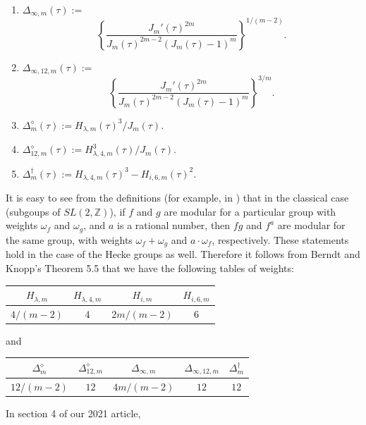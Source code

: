 \documentclass{article}
\begin{document}
 \begin{definition}
 \begin{enumerate}
 \item
$\Delta_{\infty,m}(\tau):=$
 $$
 \left \{ \frac{J_m'(\tau)^{2m}}
 {J_m(\tau)^{2m-2}(J_m(\tau)-1)^m}
\right \}^{1/(m-2)}.
 $$
 \item $\Delta_{\infty,12,m}(\tau):=$
 $$
 \left \{ \frac{J_m'(\tau)^{2m}}
 {J_m(\tau)^{2m-2}(J_m(\tau)-1)^m}
\right \}^{3/m}.
 $$
\item $\Delta^{\diamond}_m(\tau):=
H_{\lambda,m}(\tau)^3/J_m(\tau)$.
\item 
$\Delta^{\diamond}_{12,m}(\tau):= 
H_{\lambda,4,m}^3(\tau)/J_m(\tau)$.
\item $\Delta^{\dagger}_m(\tau):=
H_{\lambda,4,m}(\tau)^3-H_{i,6,m}(\tau)^2$.
 \end{enumerate}
 \end{definition} 
 \begin{remark}
 It is
 easy to see from the definitions
 (for example, in \cite{serre1970course}) that 
 in the classical case (subgoups of 
 $SL(2,\mathbb{Z})$), if
 $f$ and $g$ are modular for a particular group
 with weights $\omega_f$ and $\omega_g$,
 and $a$  is a rational number,
 then $fg$ and  $f^a$ are modular for the same group,
 with weights $\omega_f + \omega_g$ 
 and $a \cdot \omega_f$, respectively.
 These statements hold in the case of the Hecke groups
 as well.
 Therefore it follows from Berndt and Knopp's 
 Theorem 5.5 that 
  we have the following tables of weights:
 \begin{center}
\begin{tabular}{|c|c|c|c|} \hline
$H_{\lambda,m}$& $H_{\lambda,4,m}$ &$H_{i,m}$
& $H_{i,6,m}$  \\ \hline
 $4/(m-2)$&  $4$  & $2m/(m-2)$ & $6$ \\ \hline
\end{tabular} 
\end{center}
and
\begin{center}
\begin{tabular}{|c|c|c|c|c|} \hline
 $\Delta^{\diamond}_m$ 
&  $\Delta^{\diamond}_{12,m}$ & $\Delta_{\infty,m}$ 
& $\Delta_{\infty,12,m}$
& $\Delta^{\dagger}_m$\\ \hline
 $12/(m-2)$ &  $12$ &  
 $4m/(m-2)$ & $12$ & $12$\\ \hline
\end{tabular} 
\end{center}
 \end{remark}
\noindent
In section 4 of our 2021 article,
\end{document}
